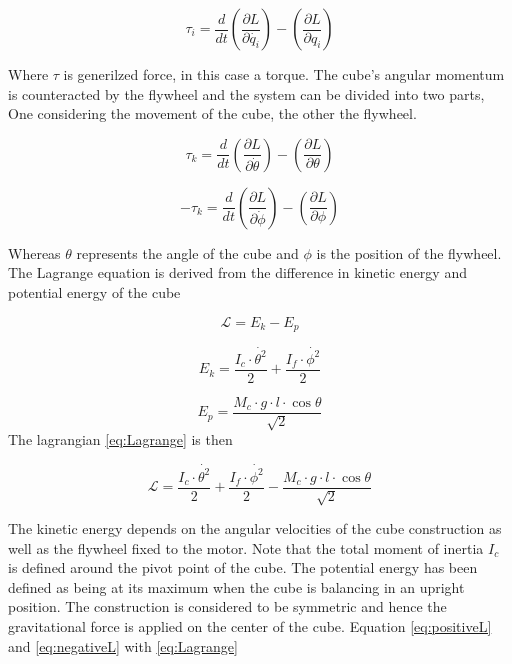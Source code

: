 \documentclass[a4paper,11pt]{kth-mag}
\begin{document}
\begin{equation}
\tau_i=\frac{d}{dt}\left(\frac{\partial L}{\partial \dot{q_i}}\right)-\left(\frac{\partial L}{\partial q_i}\right)
\end{equation}

Where $\tau$ is generilzed force, in this case a torque. The cube's angular momentum is counteracted by the flywheel and the system can be divided into two parts, One considering the movement of the cube, the other the flywheel.

\begin{equation} \label{eq:positiveL}
\tau_k=\frac{d}{dt}\left(\frac{\partial L}{\partial \dot{\theta}}\right)-\left(\frac{\partial L}{\partial \theta}\right)
\end{equation}

\begin{equation} \label{eq:negativeL}
-\tau_k=\frac{d}{dt}\left(\frac{\partial L}{\partial \dot{\phi}}\right)-\left(\frac{\partial L}{\partial \phi}\right)
\end{equation}

Whereas $\theta$ represents the angle of the cube and $\phi$ is the position of the flywheel. \\
The Lagrange equation is derived from the difference in kinetic energy and potential energy of the cube

\begin{equation} \label{eq:Lagrange}
\mathcal{L} = E_k - E_p
\end{equation}

\begin{equation} \label{eq:kinetic energy}
E_k = \frac{I_c \cdot \dot{\theta^2}}{2} + \frac{I_f \cdot \dot{\phi^2} }{2}
\end{equation}

\begin{equation} \label{eq:potential energy}
E_p = \frac{M_c \cdot g \cdot l \cdot \cos \theta}{\sqrt{2}}
\end{equation}
The lagrangian \eqref{eq:Lagrange} is then

\begin{equation}
\mathcal{L} = \frac{I_c \cdot \dot{\theta^2}}{2} + \frac{I_f \cdot \dot{\phi^2} }{2} - \frac{M_c \cdot g \cdot l \cdot \cos \theta}{\sqrt{2}} 
\end{equation}

The kinetic energy depends on the angular velocities of the cube construction as well as the flywheel fixed to the motor. Note that the total moment of inertia $I_c$ is defined around the pivot point of the cube. The potential energy has been defined as being at its maximum when the cube is balancing in an upright position. The construction is considered to be symmetric and hence the gravitational force is applied on the center of the cube.
Equation \eqref{eq:positiveL} and \eqref{eq:negativeL} with \eqref{eq:Lagrange}
\end{document}
